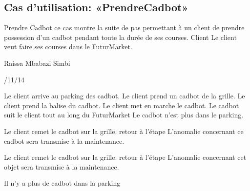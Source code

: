 \subsection{Cas d'utilisation: «PrendreCadbot» }

\startCU
\nom Prendre Cadbot
\but  ce cas montre la suite de pas permettant à un client de prendre possession d'un cadbot pendant toute la durée de ses courses.
\acteur Client
\precondition Le client veut faire ses courses dans le FuturMarket.

\auteur Raissa Mbabazi Simbi
\date 7/11/14

\nominal %
\startnominal
\etape[SA1] Le client arrive au parking des cadbot. 
\etape[RETOUR] 	Le client prend un cadbot de la grille.
\etape[SE1] Le client prend la balise du cadbot.
\etape Le client met en marche le cadbot.
\etape Le cadbot suit le client tout au long du FuturMarket
\stopnominal
\postcondition Le cadbot n'est plus dans le parking.

\alternatifs
\startalternatif[SA1] %
  \etape[SE1]  Le client remet le cadbot sur la grille.
  \etape retour à l'étape \in[RETOUR]
\stopcondition
\postcondition L'anomalie concernant ce cadbot sera transmise à la maintenance.
\stopalternatif

\startalternatif[SE1]
   \etape  Le client remet le cadbot sur la grille.
  \etape retour à l'étape \in[RETOUR]
\stopcondition
\postcondition L'anomalie concernant cet objet sera transmise à la maintenance.
\stopalternatif


\exception
Il n'y a plus de cadbot dans la parking
\stopCU
